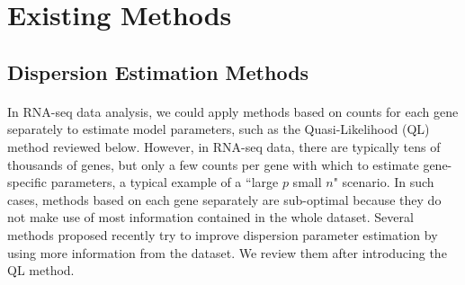 \documentclass[10pt]{article}
\begin{document}


\section*{Existing Methods}

\subsection*{Dispersion Estimation Methods} \label{sec:disp}

\paragraph{} \indent In RNA-seq data analysis, we could apply methods based on counts for each gene separately to estimate model parameters, such as the Quasi-Likelihood (QL) method reviewed below. However,
in RNA-seq data, there are typically tens of thousands of genes, but only a few counts per gene with which to estimate gene-specific parameters, a typical example of a ``large $p$ small $n$" scenario. In such cases, methods based on each gene separately are sub-optimal because they do not make use of most information contained in the whole dataset. Several methods proposed recently try to improve  dispersion parameter estimation by using more information from the dataset. We review them after introducing the QL method.
\end{document}
